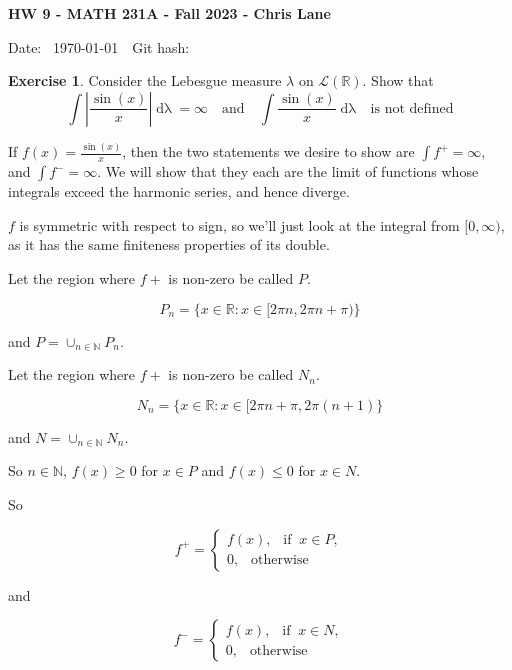 \documentclass[11pt,oneside]{article}
\numberwithin{equation}{section}
\theoremstyle{definition}
\newtheorem{exercise}{Exercise}
\def\RR{\mathbb{R}}
\def\NN{\mathbb{N}}
\def\fancyL{\mathcal{L}}
\begin{document}
\textbf{HW 9 - MATH 231A - Fall 2023 - Chris Lane}

Date: \hhmmsstime{} \ \today \ \ Git hash: 
 

\begin{exercise}
  Consider the Lebesgue measure $\lambda$ on $\fancyL(\RR)$.  Show that
  \[
  \int \left| \frac{\sin(x)}{x} \right| \mathop{d\lambda(x)} = \infty \quad \textrm{and} \quad   \int \frac{\sin(x)}{x} \mathop{d\lambda(x)} \ \ \textrm{ is not defined}
  \]
  
\end{exercise}
\begin{solution}

  If $f(x) = \frac{\sin(x)}{x}$, then the two statements we desire to
  show are $\int f^+ = \infty$, and $\int f^- = \infty$.  We will show
  that they each are the limit of functions whose integrals exceed the
  harmonic series, and hence diverge.

  $f$ is symmetric with respect to sign, so we'll just look at the integral from
  $[0, \infty)$, as it has the same finiteness properties of its double.

    Let the region where $f+$ is non-zero be called $P$.

    \[
    P_n = \{ x \in \RR : x \in [ 2 \pi n, 2 \pi n + \pi) \} 
   \]

   and $ P = \cup _ { n \in \NN } P_n$.  
   
      Let the region where $f+$ is non-zero be called $N_n$.

  \[
    N_n = \{ x \in \RR : x \in [ 2 \pi n + \pi , 2 \pi (n + 1) \}
  \]

  and $N = \cup _ { n \in \NN} N_n$.
  
  So $n \in \NN$, $f(x) \geq 0$ for $ x \in P$ and $f(x) \leq 0$ for $ x \in N$.  

  So

      \[
      f^+ = \begin{cases}
        f(x), \ \ \textrm{ if } \ x \in P, \\
          0, \ \ \textrm{ otherwise }
      \end{cases}
      \]
      
      and

      \[
      f^- = \begin{cases}
        f(x), \ \ \textrm{ if } \ x \in N, \\
          0, \ \ \textrm{ otherwise }
      \end{cases}
      \]
      

\end{solution}
\end{document}
